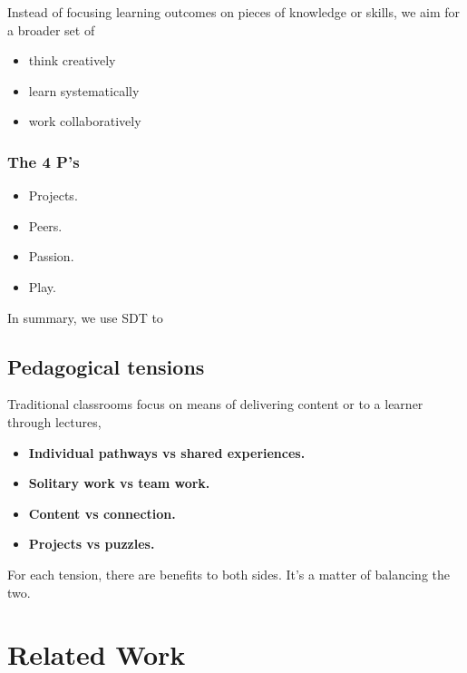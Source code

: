 \documentclass[12pt,twoside,vi]{mitthesis}
\begin{document}
Instead of focusing learning outcomes on pieces of knowledge or skills, we aim for a broader set of 

\begin{itemize}
\item think creatively
\item learn systematically
\item work collaboratively
\end{itemize}

\cite{creativelearningfuturework}\cite{roleofmaking}

\subsection{The 4 P's}

\begin{itemize}
\item Projects. 
\item Peers. 
\item Passion. 
\item Play. 
\end{itemize}

\cite{cultivating}\cite{resnick2014give}

In summary, we use SDT to 

\section{Pedagogical tensions}

Traditional classrooms focus on means of delivering content or  to a learner through lectures, 

\begin{itemize}
	\item \textbf{Individual pathways vs shared experiences.} 
	\item \textbf{Solitary work vs team work.} 
	\item \textbf{Content vs connection.} 
	\item \textbf{Projects vs puzzles.} 
\end{itemize} 

For each tension, there are benefits to both sides. It's a matter of balancing the two.

\cite{learningcreativelearning}

\chapter{Related Work}
\end{document}
